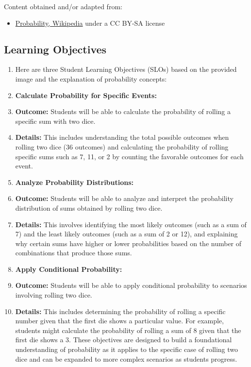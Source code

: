 Content obtained and/or adapted from:



\begin{itemize}
    \item \href{https://en.wikipedia.org/wiki/Probability}{Probability, Wikipedia} under a CC BY-SA license
\end{itemize}


\subsection{Learning Objectives}
\label{ssec:lear-fe6e}


\begin{enumerate}
    \item Here are three Student Learning Objectives (SLOs) based on the provided image and the explanation of probability concepts:
    \item \textbf{Calculate Probability for Specific Events:}
    \item \textbf{Outcome:} Students will be able to calculate the probability of rolling a specific sum with two dice.
    \item \textbf{Details:} This includes understanding the total possible outcomes when rolling two dice (36 outcomes) and calculating the probability of rolling specific sums such as 7, 11, or 2 by counting the favorable outcomes for each event.
    \item \textbf{Analyze Probability Distributions:}
    \item \textbf{Outcome:} Students will be able to analyze and interpret the probability distribution of sums obtained by rolling two dice.
    \item \textbf{Details:} This involves identifying the most likely outcomes (such as a sum of 7) and the least likely outcomes (such as a sum of 2 or 12), and explaining why certain sums have higher or lower probabilities based on the number of combinations that produce those sums.
    \item \textbf{Apply Conditional Probability:}
    \item \textbf{Outcome:} Students will be able to apply conditional probability to scenarios involving rolling two dice.
    \item \textbf{Details:} This includes determining the probability of rolling a specific number given that the first die shows a particular value. For example, students might calculate the probability of rolling a sum of 8 given that the first die shows a 3. These objectives are designed to build a foundational understanding of probability as it applies to the specific case of rolling two dice and can be expanded to more complex scenarios as students progress.
\end{enumerate}


